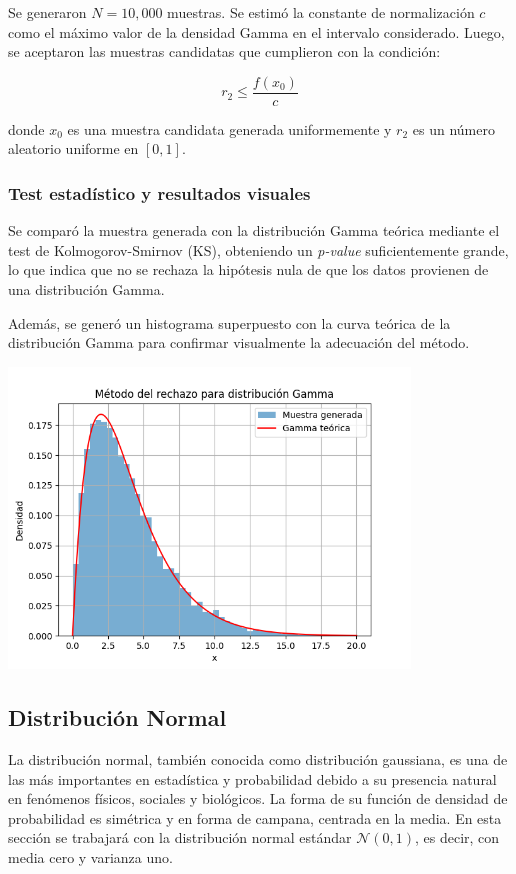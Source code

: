\documentclass{article}
\begin{document}
Se generaron $N = 10{,}000$ muestras. Se estimó la constante de normalización $c$ como el máximo valor de la densidad Gamma en el intervalo considerado. Luego, se aceptaron las muestras candidatas que cumplieron con la condición:

\[
r_2 \leq \frac{f(x_0)}{c}
\]

donde $x_0$ es una muestra candidata generada uniformemente y $r_2$ es un número aleatorio uniforme en $[0,1]$.

\subsubsection{Test estadístico y resultados visuales}

Se comparó la muestra generada con la distribución Gamma teórica mediante el test de Kolmogorov-Smirnov (KS), obteniendo un \textit{p-value} suficientemente grande, lo que indica que no se rechaza la hipótesis nula de que los datos provienen de una distribución Gamma.

Además, se generó un histograma superpuesto con la curva teórica de la distribución Gamma para confirmar visualmente la adecuación del método.

\begin{center}
    \includegraphics[width=0.8\textwidth]{visualizaciones/gamma_rechazo.png}
\end{center}







\subsection{Distribución Normal}

La distribución normal, también conocida como distribución gaussiana, es una de las más importantes en estadística y probabilidad debido a su presencia natural en fenómenos físicos, sociales y biológicos. La forma de su función de densidad de probabilidad es simétrica y en forma de campana, centrada en la media. En esta sección se trabajará con la distribución normal estándar \( \mathcal{N}(0, 1) \), es decir, con media cero y varianza uno.
\end{document}
